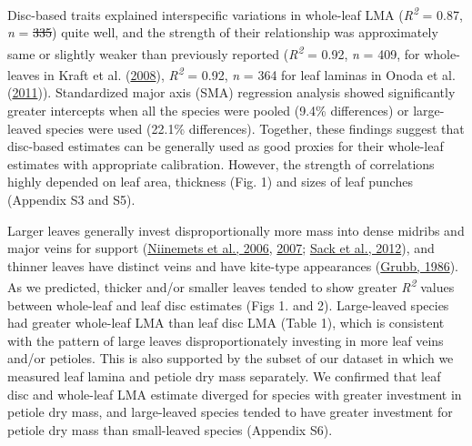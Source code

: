 \documentclass[
  12pt,
  a4paper,
,tablecaptionabove
]{scrartcl}
\providecommand{\DIFaddtex}[1]{{\protect\color{blue}\uwave{#1}}} %
\providecommand{\DIFdeltex}[1]{{\protect\color{red}\sout{#1}}}                      %
\providecommand{\DIFaddbegin}{} %
\providecommand{\DIFaddend}{} %
\providecommand{\DIFdelbegin}{} %
\providecommand{\DIFdelend}{} %
\providecommand{\DIFadd}[1]{\texorpdfstring{\DIFaddtex{#1}}{#1}} %
\providecommand{\DIFdel}[1]{\texorpdfstring{\DIFdeltex{#1}}{}} %
\newcommand{\DIFscaledelfig}{0.5}
\newlength{\DIFdelgraphicswidth} %
\newlength{\DIFdelgraphicsheight} %
\newcommand{\DIFaddincludegraphics}[2][]{{\color{blue}\fbox{\DIFOincludegraphics[#1]{#2}}}} %
\newcommand{\DIFdelincludegraphics}[2][]{%
\sbox{\DIFdelgraphicsbox}{\DIFOincludegraphics[#1]{#2}}%
\settoboxwidth{\DIFdelgraphicswidth}{\DIFdelgraphicsbox} %
\settoboxtotalheight{\DIFdelgraphicsheight}{\DIFdelgraphicsbox} %
\scalebox{\DIFscaledelfig}{%
\parbox[b]{\DIFdelgraphicswidth}{\usebox{\DIFdelgraphicsbox}\\[-\baselineskip] \rule{\DIFdelgraphicswidth}{0em}}\llap{\resizebox{\DIFdelgraphicswidth}{\DIFdelgraphicsheight}{%
\setlength{\unitlength}{\DIFdelgraphicswidth}%
\begin{picture}(1,1)%
\thicklines\linethickness{2pt} %
{\color[rgb]{1,0,0}\put(0,0){\framebox(1,1){}}}%
{\color[rgb]{1,0,0}\put(0,0){\line( 1,1){1}}}%
{\color[rgb]{1,0,0}\put(0,1){\line(1,-1){1}}}%
\end{picture}%
}\hspace*{3pt}}} %
} %
\DeclareRobustCommand{\DIFaddbegin}{\DIFOaddbegin \let\includegraphics\DIFaddincludegraphics} %
\DeclareRobustCommand{\DIFaddend}{\DIFOaddend \let\includegraphics\DIFOincludegraphics} %
\DeclareRobustCommand{\DIFdelbegin}{\DIFOdelbegin \let\includegraphics\DIFdelincludegraphics} %
\DeclareRobustCommand{\DIFdelend}{\DIFOaddend \let\includegraphics\DIFOincludegraphics} %
\begin{document}
Disc-based traits explained interspecific variations in whole-leaf LMA
(\emph{R\textsuperscript{2}} = 0.87, \emph{n} = \DIFdelbegin \DIFdel{335}\DIFdelend \DIFaddbegin \DIFadd{334}\DIFaddend ) quite well, and the
strength of their relationship was approximately same or slightly weaker
than previously reported (\emph{R\textsuperscript{2}} = 0.92, \emph{n} =
409, for whole-leaves in Kraft et al.
(\protect\hyperlink{ref-Kraft2008}{2008}), \emph{R\textsuperscript{2}} =
0.92, \emph{n} = 364 for leaf laminas in Onoda et al.
(\protect\hyperlink{ref-Onoda2011}{2011})). Standardized major axis
(SMA) regression analysis showed significantly greater intercepts when
all the species were pooled (9.4\% differences) or large-leaved species
were used (22.1\% differences). Together, these findings suggest that
disc-based estimates can be generally used as good proxies for their
whole-leaf estimates with appropriate calibration. However, the strength
of correlations highly depended on leaf area, thickness (Fig. 1) and
sizes of leaf punches (Appendix S3 and S5).

Larger leaves generally invest disproportionally more mass into dense
midribs and major veins for support
(\protect\hyperlink{ref-Niinemets2006}{Niinemets et al., 2006},
\protect\hyperlink{ref-Niinemets2007}{2007};
\protect\hyperlink{ref-Sack2012}{Sack et al., 2012}), and thinner leaves
have distinct veins and have kite-type appearances
(\protect\hyperlink{ref-Grubb1986}{Grubb, 1986}). As we predicted,
thicker and/or smaller leaves tended to show greater
\emph{R\textsuperscript{2}} values between whole-leaf and leaf disc
estimates (Figs 1. and 2). Large-leaved species had greater whole-leaf
LMA than leaf disc LMA (Table 1), which is consistent with the pattern
of large leaves disproportionately investing in more leaf veins and/or
petioles. This is also supported by the subset of our dataset in which
we measured leaf lamina and petiole dry mass separately. We confirmed
that leaf disc and whole-leaf LMA estimate diverged for species with
greater investment in petiole dry mass, and large-leaved species tended
to have greater investment for petiole dry mass than small-leaved
species (Appendix S6).
\end{document}
